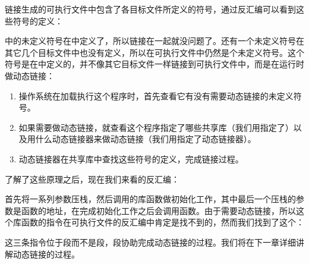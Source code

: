 

链接生成的可执行文件中包含了各目标文件所定义的符号，通过反汇编可以看到这些符号的定义：




中的未定义符号在中定义了，所以链接在一起就没问题了。还有一个未定义符号在其它几个目标文件中也没有定义，所以在可执行文件中仍然是个未定义符号。这个符号是在中定义的，并不像其它目标文件一样链接到可执行文件中，而是在运行时做动态链接：


\begin{enumerate}

\item 操作系统在加载执行这个程序时，首先查看它有没有需要动态链接的未定义符号。

\item 如果需要做动态链接，就查看这个程序指定了哪些共享库（我们用指定了）以及用什么动态链接器来做动态链接（我们用指定了动态链接器）。

\item 动态链接器在共享库中查找这些符号的定义，完成链接过程。
\end{enumerate}


了解了这些原理之后，现在我们来看的反汇编：




首先将一系列参数压栈，然后调用的库函数做初始化工作，其中最后一个压栈的参数是函数的地址，在完成初始化工作之后会调用函数。由于需要动态链接，所以这个库函数的指令在可执行文件的反汇编中肯定是找不到的，然而我们找到了这个：




这三条指令位于段而不是段，段协助完成动态链接的过程。我们将在下一章详细讲解动态链接的过程。




